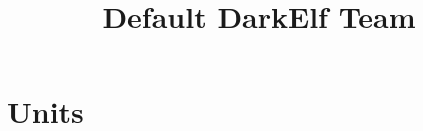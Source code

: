 \documentclass[a4,12pt, color, hyperref]{book}
\title{Default DarkElf Team}
\begin{document}
\chapter{Units}

\end{document}
